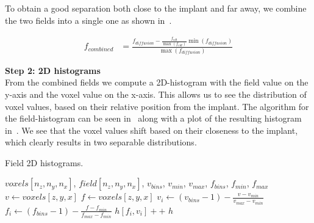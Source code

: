 To obtain a good separation both close to the implant and far away, we combine the two fields into a
single one as shown in~.

%

\begin{equation}
    \label{eq:field-comb}
    \begin{split}
        f_{combined} &= \frac{f_{diffusion} - \frac{f_{edt}}{\max (f_{edt})} \min (f_{diffusion})}{\max (f_{diffusion})}
    \end{split}
\end{equation}

\vspace{\baselineskip}
\noindent\textbf{Step 2: 2D histograms} \\
From the combined fields we compute a 2D-histogram with the field value on the y-axis and the voxel
value on the x-axis.  This allows us to see the distribution of voxel values, based on their
relative position from the implant. The algorithm for the field-histogram can be seen in~
along with a plot of the resulting histogram in~. We see that the voxel values
shift based on their closeness to the implant, which clearly results in two separable distributions.

\begin{algorithm}
    \caption{Field 2D histograms.}
    \label{alg:field-hist}
    \begin{algorithmic}
         {$voxels[n_z,n_y,n_x]$, $field[n_z,n_y,n_x]$, $v_{bins}$, \indent \indent $v_{min}$, $v_{max}$, $f_{bins}$, $f_{min}$, $f_{max}$}
                \State $v \gets voxels[z,y,x]$
                    \State $f \gets voxels[z,y,x]$
                        \State $v_i \gets (v_{bins} - 1) - \frac{v - v_{min}}{v_{max} - v_{min}}$
                        \State $f_i \gets (f_{bins} - 1) - \frac{f - f_{min}}{f_{max} - f_{min}}$
                        \State $h[f_i,v_i]{+}{+}$
                    \EndIf
                \EndIf
            \EndFor
            \Return $h$
        \EndFunction
    \end{algorithmic}
\end{algorithm}

